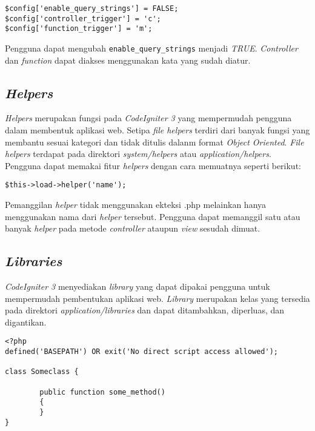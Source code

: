 \begin{lstlisting}[caption=\textit{File application/config.php}, label=kode:querystring]
$config['enable_query_strings'] = FALSE;
$config['controller_trigger'] = 'c';
$config['function_trigger'] = 'm';
\end{lstlisting}

Pengguna dapat mengubah \verb|enable_query_strings| menjadi \textit{TRUE}. \textit{Controller} dan \textit{function} dapat diakses menggunakan kata yang sudah diatur.

\subsection{\textit{Helpers}}
\textit{Helpers} merupakan fungsi pada \textit{CodeIgniter 3}
yang mempermudah pengguna dalam membentuk aplikasi web. Setipa \textit{file helpers} terdiri dari banyak fungsi yang membantu sesuai kategori dan tidak ditulis dalanm format \textit{Object Oriented}. \textit{File helpers} terdapat pada direktori \textit{system/helpers} atau \textit{application/helpers}. Pengguna dapat memakai fitur \textit{helpers} dengan cara memuatnya seperti berikut:

\begin{center}
\verb|$this->load->helper('name');|
\end{center}

Pemanggilan \textit{helper} tidak menggunakan ekteksi .php melainkan hanya menggunakan nama dari \textit{helper} tersebut. Pengguna dapat memanggil satu atau banyak \textit{helper} pada metode \textit{controller} ataupun \textit{view} sesudah dimuat.

\subsection{\textit{Libraries}}
\textit{CodeIgniter 3} menyediakan \textit{library} yang dapat dipakai pengguna untuk mempermudah pembentukan aplikasi web. \textit{Library} merupakan kelas yang tersedia pada direktori \textit{application/libraries} dan dapat ditambahkan, diperluas, dan digantikan. 

\begin{lstlisting}[caption=Contoh kelas \textit{library} pada \textit{CodeIgniter 3}, label=kode:libraryclass]
<?php
defined('BASEPATH') OR exit('No direct script access allowed');

class Someclass {

        public function some_method()
        {
        }
}
\end{lstlisting}

